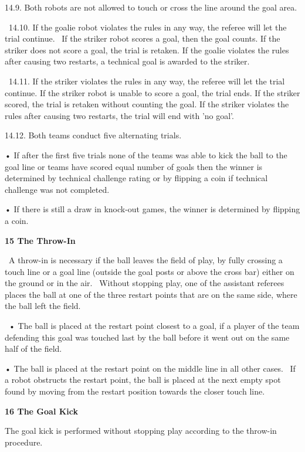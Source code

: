 \documentclass[a4paper]{article}
\begin{document}
14.9. Both robots are not allowed to touch or cross the line around the goal area.

\ 14.10. If the goalie robot violates the rules in any way, the referee will let the trial continue. \ If the striker
robot scores a goal, then the goal counts. If the striker does not score a goal, the trial is retaken. If the goalie
violates the rules after causing two restarts, a technical goal is awarded to the striker.

\ 14.11. If the striker violates the rules in any way, the referee will let the trial continue. If the striker robot is
unable to score a goal, the trial ends. If the striker scored, the trial is retaken without counting the goal. If the
striker violates the rules after causing two restarts, the trial will end with 'no goal'.

14.12. Both teams conduct five alternating trials.

• If after the first five trials none of the teams was able to kick the ball to the goal line or teams have scored equal
number of goals then the winner is determined by technical challenge rating or by flipping a coin if technical
challenge was not completed.

• If there is still a draw in knock-out games, the winner is determined by flipping a coin.

\bigskip

\textbf{15 The Throw-In}

\ A throw-in is necessary if the ball leaves the field of play, by fully crossing a touch line or a goal line (outside
the goal posts or above the cross bar) either on the ground or in the air. \ Without stopping play, one of the
assistant referees places the ball at one of the three restart points that are on the same side, where the ball left
the field.

\ • The ball is placed at the restart point closest to a goal, if a player of the team defending this goal was touched
last by the ball before it went out on the same half of the field. \ 

• The ball is placed at the restart point on the middle line in all other cases. \ If a robot obstructs the restart
point, the ball is placed at the next empty spot found by moving from the restart position towards the closer touch
line.

\bigskip

\textbf{16 The Goal Kick}

The goal kick is performed without stopping play according to the throw-in procedure.
\end{document}
